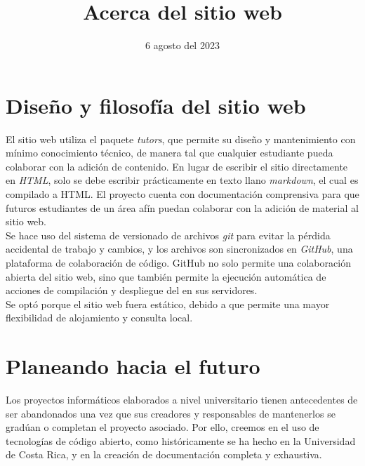 \documentclass{article}
\title{\textbf{Acerca del sitio web}}
\date{6 agosto del 2023}
\begin{document}
\maketitle

\section{Diseño y filosofía del sitio web}
El sitio web utiliza el paquete \emph{tutors}, que permite su diseño
y mantenimiento con mínimo conocimiento técnico, de manera tal que
cualquier estudiante pueda colaborar con la adición de contenido. En
lugar de escribir el sitio directamente en \emph{HTML}, solo se debe
escribir prácticamente en texto llano \emph{markdown}, el cual es
compilado a HTML. El proyecto cuenta con documentación comprensiva
para que futuros estudiantes de un área afín puedan colaborar con la
adición de material al sitio web.\\

Se hace uso del sistema de versionado de archivos \emph{git} para
evitar la pérdida accidental de trabajo y cambios, y los archivos son
sincronizados en \emph{GitHub}, una plataforma de colaboración de
código. GitHub no solo permite una colaboración abierta del sitio
web, sino que también permite la ejecución automática de acciones de
compilación y despliegue del en sus servidores.\\

Se optó porque el sitio web fuera estático, debido a que permite una
mayor flexibilidad de alojamiento y consulta local.

\section{Planeando hacia el futuro}

Los proyectos informáticos elaborados a nivel universitario tienen
antecedentes de ser abandonados una vez que sus creadores y
responsables de mantenerlos se gradúan o completan el proyecto
asociado. Por ello, creemos en el uso de tecnologías de código
abierto, como históricamente se ha hecho en la Universidad de Costa
Rica, y en la creación de documentación completa y exhaustiva.\\
\end{document}
